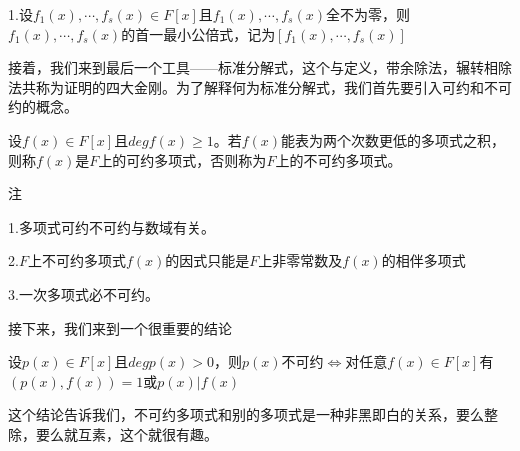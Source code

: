 \documentclass[lang=cn,10pt]{elegantbook}
\begin{document}
1.设$f_1(x),\cdots,f_s(x)\in F[x]$且$f_1(x),\cdots,f_s(x)$全不为零，则$f_1(x),\cdots,f_s(x)$的首一最小公倍式，记为$[f_1(x),\cdots,f_s(x)]$

接着，我们来到最后一个工具——标准分解式，这个与定义，带余除法，辗转相除法共称为证明的四大金刚。为了解释何为标准分解式，我们首先要引入可约和不可约的概念。
\begin{definition}[可约性]
	设$f(x)\in F[x]$且$deg{f}(x)\geq1$。若$f(x)$能表为两个次数更低的多项式之积，则称$f(x)$是$F$上的可约多项式，否则称为$F$上的不可约多项式。
\end{definition}
注

1.多项式可约不可约与数域有关。

2.$F$上不可约多项式$f(x)$的因式只能是$F$上非零常数及$f(x)$的相伴多项式

3.一次多项式必不可约。

接下来，我们来到一个很重要的结论
\begin{conclusion}
	设$p(x)\in F[x]$且$deg{p}(x)>0$，则$p(x)$不可约$\Leftrightarrow$对任意$f(x)\in F[x]$有$(p(x),f(x))=1$或$p(x)|f(x)$
\end{conclusion}
这个结论告诉我们，不可约多项式和别的多项式是一种非黑即白的关系，要么整除，要么就互素，这个就很有趣。
\end{document}
